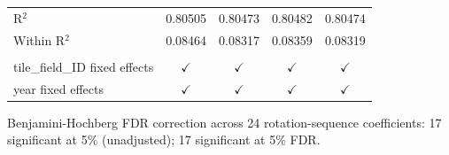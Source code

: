 \begin{table}[H]
\begin{tabular}{lcccc}
      R$^2$                           & 0.80505                 & 0.80473                  & 0.80482                  & 0.80474\\  
      Within R$^2$                    & 0.08464                 & 0.08317                  & 0.08359                  & 0.08319\\  
       \\
      tile\_field\_ID fixed effects   & $\checkmark$            & $\checkmark$             & $\checkmark$             & $\checkmark$\\   
      year fixed effects              & $\checkmark$            & $\checkmark$             & $\checkmark$             & $\checkmark$\\   
      \bottomrule
   \end{tabular}
   
   \par \raggedright 
   Benjamini-Hochberg FDR correction across 24 rotation-sequence coefficients: 17 significant at 5\% (unadjusted); 17 significant at 5\% FDR.
\end{table}


